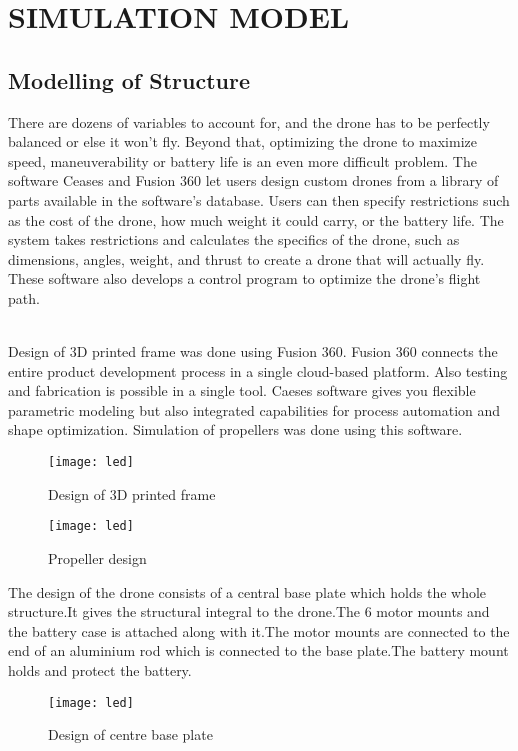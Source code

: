 \documentclass[12pt,a4paper]{report}
\begin{document}
\chapter{{SIMULATION MODEL}}


\section{Modelling of Structure}



\hspace*{1cm} There are dozens of variables to account for, and the drone has to be perfectly balanced or else it won't fly. Beyond that, optimizing the drone to maximize speed, maneuverability or battery life is an even more difficult problem. The software Ceases and Fusion 360 let users design custom drones from a library of parts available in the software's database. Users can then specify restrictions such as the cost of the drone, how much weight it could carry, or the battery life.
The system  takes  restrictions and calculates the specifics of the drone, such as dimensions, angles, weight, and thrust to create a drone that will actually fly. These software also develops a control program to optimize the drone's flight path.\\\

\hspace*{1cm} Design of 3D printed frame was done using Fusion 360. Fusion 360 connects the entire product development process in a single cloud-based platform. Also testing and fabrication is possible in a single tool. Caeses software gives you flexible parametric modeling but also integrated capabilities for process automation and shape optimization. Simulation of propellers was done using this software.

\begin{figure}[h!]
\centering
\texttt{[image: led]}
\caption{Design of 3D printed frame}
\label{circuit}
\end{figure}

\begin{figure}[h!]
\centering
\texttt{[image: led]}
\caption{Propeller design}
\label{circuit}
\end{figure}
\hspace*{1cm}The design of the drone consists of a central base plate which holds the whole structure.It gives the structural integral to the drone.The 6 motor mounts and the battery case is attached along with it.The motor mounts are connected to the end of an aluminium rod which is connected to the base plate.The battery mount holds and protect the battery.
\begin{figure}[h!]
\centering
\texttt{[image: led]}
\caption{Design of centre base plate}
\label{circuit}
\end{figure}
\end{document}
